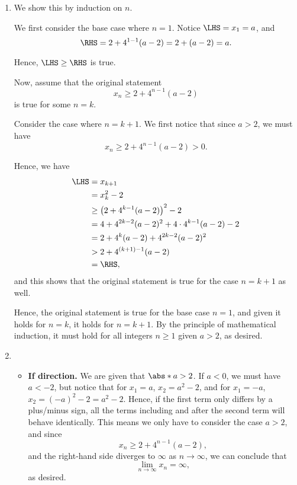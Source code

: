 \Question{\currfilebase}

\begin{enumerate}
    \item We show this by induction on \(n\).

          We first consider the base case where \(n = 1\). Notice \(\LHS = x_1 = a\), and
          \[
              \RHS = 2 + 4^{1 - 1} (a - 2) = 2 + (a - 2) = a.
          \]

          Hence, \(\LHS \geq \RHS\) is true.

          Now, assume that the original statement
          \[
              x_n \geq 2 + 4^{n - 1} (a - 2)
          \]
          is true for some \(n = k\).

          Consider the case where \(n = k + 1\). We first notice that since \(a > 2\), we must have
          \[
              x_n \geq 2 + 4^{n - 1} (a - 2) > 0.
          \]

          Hence, we have
          \begin{align*}
              \LHS & = x_{k + 1}                                              \\
                   & = x_{k}^2 - 2                                            \\
                   & \geq \left(2 + 4^{k - 1} (a - 2)\right)^2 - 2            \\
                   & = 4 + 4^{2k - 2}(a - 2)^2 + 4 \cdot 4^{k - 1}(a - 2) - 2 \\
                   & = 2 + 4^{k} (a - 2) + 4^{2k - 2} (a - 2)^2               \\
                   & > 2 + 4^{(k + 1) - 1}(a - 2)                             \\
                   & = \RHS,
          \end{align*}
          and this shows that the original statement is true for the case \(n = k + 1\) as well.

          Hence, the original statement is true for the base case \(n = 1\), and given it holds for \(n = k\), it holds for \(n = k + 1\). By the principle of mathematical induction, it must hold for all integers \(n \geq 1\) given \(a > 2\), as desired.

    \item \begin{itemize}
              \item \textbf{If direction.} We are given that \(\abs*{a} > 2\). If \(a < 0\), we must have \(a < -2\), but notice that for \(x_1 = a\), \(x_2 = a^2 - 2\), and for \(x_1 = -a\), \(x_2 = (-a)^2 - 2 = a^2 - 2\). Hence, if the first term only differs by a plus/minus sign, all the terms including and after the second term will behave identically. This means we only have to consider the case \(a > 2\), and since
                    \[
                        x_n \geq 2 + 4^{n - 1}(a - 2),
                    \]
                    and the right-hand side diverges to \(\infty\) as \(n \to \infty\), we can conclude that
                    \[
                        \lim_{n \to \infty} x_n = \infty,
                    \]
                    as desired.


\end{itemize}
\end{enumerate}
